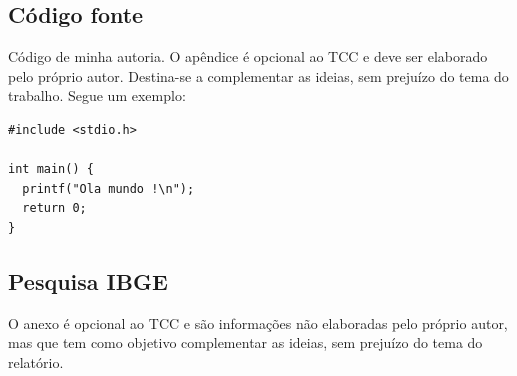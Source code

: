 \documentclass[
	12pt,				%
	openright,			%
	oneside,			%
	a4paper,			%
	chapter=TITLE,		%
	section=TITLE,		%
	english,			%
	french,				%
	spanish,			%
	brazil				%
	]{abntex2}
\begin{document}



%
%


\begin{apendicesenv}

\chapter{Código fonte}
Código de minha autoria. O apêndice é opcional ao TCC e deve ser elaborado pelo próprio autor. Destina-se a complementar as ideias, sem prejuízo do tema do trabalho. Segue um exemplo:

\scriptsize
\begin{lstlisting}
#include <stdio.h>

int main() {
  printf("Ola mundo !\n");
  return 0;
}
\end{lstlisting}

\end{apendicesenv}

\begin{anexosenv}

\chapter{Pesquisa IBGE}
O anexo é opcional ao TCC e são informações não elaboradas pelo próprio autor, mas que tem como objetivo complementar as ideias, sem prejuízo do tema do relatório.

\end{anexosenv}

\label{nropaginas}


\printindex
\end{document}
